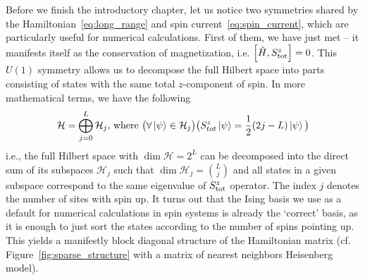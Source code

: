 Before we finish the introductory chapter, let us notice two symmetries shared by the
Hamiltonian~\eqref{eq:long_range} and spin current~\eqref{eq:spin_current}, which are particularly useful for
numerical calculations. First of them, we have just met -- it manifests itself as the conservation of magnetization,
i.e. \(\comm{\hat{H} }{\Sz_{\mathrm{tot}}}=0\).
This \(U(1)\) symmetry allows us to decompose the full Hilbert space into parts consisting of states with the same total \(z\)-component
of spin. In more mathematical terms, we have the following
\begin{equation*}
    \mathcal{H} = \bigoplus_{j = 0}^{L} \mathcal{H}_j \text{, where } \big(\forall \ket{\psi} \in \mathcal{H}_j \big) \big(S^{z}_{tot} \ket{\psi} = \frac{1}{2}(2j-L) \ket{\psi} \big)
\end{equation*}
i.e., the full Hilbert space with \(\dim{\mathcal{H}} = 2^L\) can be decomposed into the direct sum of its subspaces
\(\mathcal{H}_j\) such that \(\dim{\mathcal{H}_j} = \binom{L}{j}\) and all states in a given subspace correspond to the same
eigenvalue of \(S^{z}_{\mathrm{tot}}\) operator. The index \(j\) denotes the number of sites with spin up.
It turns out that the Ising basis we use as a default for numerical calculations in spin systems
is already the `correct' basis, as it is enough to just sort the states according to the number of
spins pointing up. This yields a manifestly block diagonal structure of the Hamiltonian matrix
(cf. Figure~\ref{fig:sparse_structure} with a matrix of nearest neighbors Heisenberg model).

